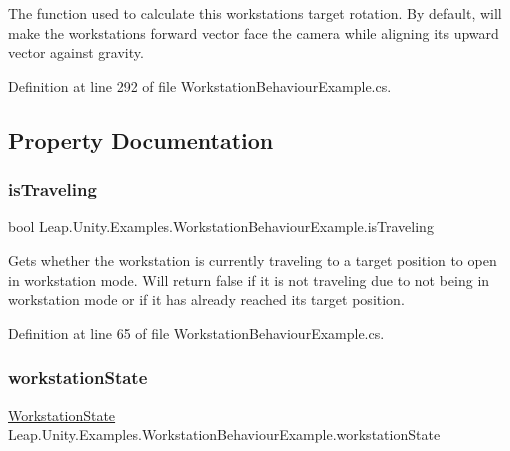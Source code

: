 The function used to calculate this workstation\textquotesingle{}s target rotation. By default, will make the workstation\textquotesingle{}s forward vector face the camera while aligning its upward vector against gravity. 



Definition at line 292 of file Workstation\+Behaviour\+Example.\+cs.



\subsection{Property Documentation}
\mbox{\label{class_leap_1_1_unity_1_1_examples_1_1_workstation_behaviour_example_af8dc40bc97d0162d01fdcb5a446da67a}} 
\subsubsection{\texorpdfstring{isTraveling}{isTraveling}}
{\footnotesize\ttfamily bool Leap.\+Unity.\+Examples.\+Workstation\+Behaviour\+Example.\+is\+Traveling\hspace{0.3cm}{\ttfamily [get]}}



Gets whether the workstation is currently traveling to a target position to open in workstation mode. Will return false if it is not traveling due to not being in workstation mode or if it has already reached its target position. 



Definition at line 65 of file Workstation\+Behaviour\+Example.\+cs.

\mbox{\label{class_leap_1_1_unity_1_1_examples_1_1_workstation_behaviour_example_a84dc1a1d33dd9fbba06cc75fb3577323}} 
\subsubsection{\texorpdfstring{workstationState}{workstationState}}
{\footnotesize\ttfamily \mbox{\hyperlink{class_leap_1_1_unity_1_1_examples_1_1_workstation_behaviour_example_ae21c3ce4f1aac3e1920073e0e674cbcc}{Workstation\+State}} Leap.\+Unity.\+Examples.\+Workstation\+Behaviour\+Example.\+workstation\+State\hspace{0.3cm}{\ttfamily [get]}}



